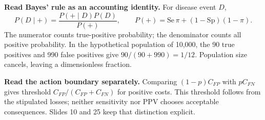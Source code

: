 \textbf{Read Bayes' rule as an accounting identity.} For disease event $D$,
\[
P(D\mid+)=\frac{P(+\mid D)P(D)}{P(+)},\qquad
P(+)=\mathrm{Se}\,\pi+(1-\mathrm{Sp})(1-\pi).
\]
The numerator counts true-positive probability; the denominator counts all positive probability. In the hypothetical population of 10,000, the 90 true positives and 990 false positives give $90/(90+990)=1/12$. Population size cancels, leaving a dimensionless fraction.

\textbf{Read the action boundary separately.} Comparing $(1-p)C_{FP}$ with $pC_{FN}$ gives threshold $C_{FP}/(C_{FP}+C_{FN})$ for positive costs. This threshold follows from the stipulated losses; neither sensitivity nor PPV chooses acceptable consequences. Slides 10 and 25 keep that distinction explicit.

\clearpage
{}
